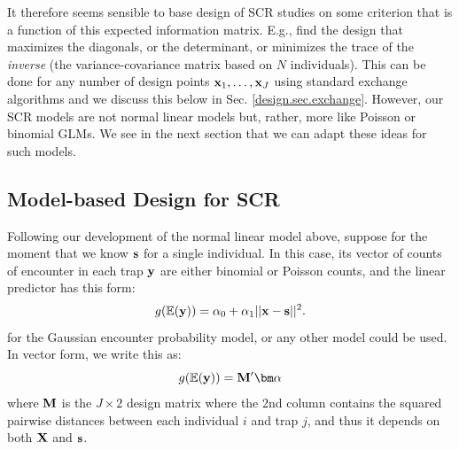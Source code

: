 It therefore seems sensible to base design of SCR studies on some
criterion that is a function of this expected information
matrix. E.g., find the design that maximizes the diagonals, or the
determinant, or minimizes the trace of the {\it inverse} (the
variance-covariance matrix based on $N$ individuals).  
This can be done for any number of design points ${\bf
  x}_{1},\ldots, {\bf x}_{J}$ using standard exchange algorithms
\citep[see][Chapt. 3]{muller:2007} and we discuss this below in
Sec. \ref{design.sec.exchange}.
However, our SCR models are not normal linear models but, rather, more
like Poisson or binomial GLMs. We see in the next section that we can
adapt these ideas for such models.


\subsection{Model-based Design for SCR}

Following our development of the normal linear model above, suppose
for the moment that we know ${\bf s}$ for a single individual.  In
this case, its vector of counts of encounter in each trap ${\bf y}$
are either binomial or Poisson counts, and the linear predictor has
this form:
\begin{equation}
g( \mathbb{E}({\bf y})  ) =  \alpha_0  + \alpha_1 ||{\bf x}-{\bf s}||^2.
\label{eq.linearpredictor}
\end{equation}
for the Gaussian encounter probability model, or any other model could
be used. In vector form, we write this as:
\[
g( \mathbb{E}({\bf y})  ) =  {\bf M}'{\bm \alpha}
\]
where ${\bf M}$ is the $J \times 2$ design matrix where the 2nd column
contains the squared pairwise distances between each individual $i$
and trap $j$, and thus it depends on both ${\bf X}$ and ${\bf s}$.

